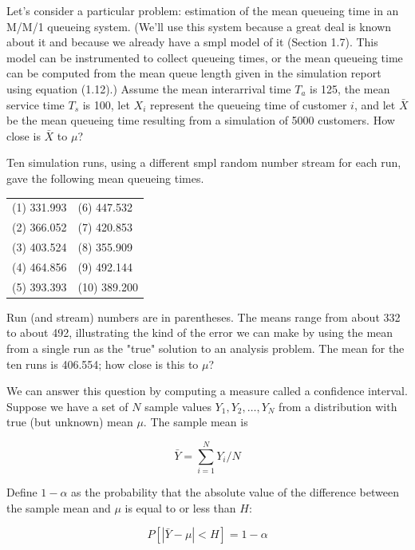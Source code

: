 Let's consider a particular problem: estimation of the mean queueing time in
an M/M/1 queueing system. (We'll use this system because a great deal is known
about it and because we already have a smpl model of it (Section 1.7). This
model can be instrumented to collect queueing times, or the mean queueing time
can be computed from the mean queue length given in the simulation report
using equation (1.12).) Assume the mean interarrival time $T_a$ is 125, the
mean service time $T_s$ is 100, let $X_i$ represent the queueing time of
customer $i$, and let $\bar{X}$ be the mean queueing time resulting from a
simulation of 5000 customers. How close is $\bar{X}$ to $\mu$?

Ten simulation runs, using a different smpl random number stream for each run,
gave the following mean queueing times.

\begin{center}
\begin{tabular}{ll}
(1) 331.993 & (6) 447.532 \\
(2) 366.052 & (7) 420.853 \\
(3) 403.524 & (8) 355.909 \\
(4) 464.856 & (9) 492.144 \\
(5) 393.393 & (10) 389.200 \\
\end{tabular}
\end{center}

Run (and stream) numbers are in parentheses. The means range from about 332 to
about 492, illustrating the kind of the error we can make by using the mean
from a single run as the "true" solution to an analysis problem. The mean for
the ten runs is 406.554; how close is this to $\mu$?

We can answer this question by computing a measure called a confidence
interval. Suppose we have a set of $N$ sample values $Y_1, Y_2, \ldots, Y_N$
from a distribution with true (but unknown) mean $\mu$. The sample mean is

\begin{equation}
\bar{Y} = \sum_{i=1}^{N} Y_i / N
\label{eq:output-mean-y}
\end{equation}

Define $1 - \alpha$ as the probability that the absolute value of the
difference between the sample mean and $\mu$ is equal to or less than $H$:

\begin{equation}
P[|\bar{Y} - \mu| < H] = 1 - \alpha
\label{eq:output-ci-def}
\end{equation}

